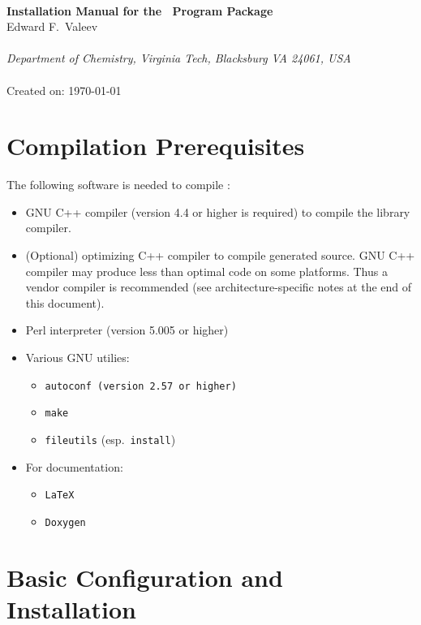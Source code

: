 \documentclass[12pt]{article}
\begin{document}


\begin{center}
\ \\
\vspace{2.0in}
{\bf {\Large Installation Manual for the \LIBINT\ Program Package}} \\
\vspace{0.5in}
Edward F.\ Valeev \\
\ \\
{\em Department of Chemistry, Virginia Tech, Blacksburg VA 24061, USA}\\
\vspace{0.3in}
\LIBINTv \\
Created on: \today
\end{center}

\thispagestyle{empty}

\newpage
\section{Compilation Prerequisites}

The following software is needed to compile \LIBINTv:
\begin{itemize}
\item GNU C++ compiler (version 4.4 or higher is required) to compile the library compiler.
\item (Optional) optimizing C++ compiler
to compile generated source. GNU C++ compiler may produce less than optimal code on some platforms.
Thus a vendor compiler is recommended (see architecture-specific notes at the end of this document).
\item Perl interpreter (version 5.005 or higher)
\item Various GNU utilies: 
\begin{itemize}
\item {\tt autoconf (version 2.57 or higher)}
\item {\tt make}
\item {\tt fileutils} (esp.\ {\tt install})
\end{itemize}
\item For documentation:
\begin{itemize}
\item {\tt LaTeX}
\item {\tt Doxygen}
\end{itemize}
\end{itemize}

\section{Basic Configuration and Installation}
\end{document}
